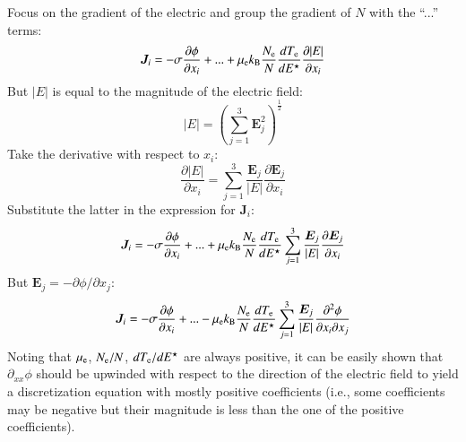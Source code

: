 \documentclass{warpdoc}
\newcommand{\nd}{3}
\renewcommand{\vec}[1]{\bm{#1}}
\begin{document}
%
Focus on the gradient of the electric and group the gradient of $N$ with the ``...'' terms:
%
\begin{equation}
 \vec{J}_i = 
- \sigma\frac{\partial \phi}{\partial x_i}
+ ...
+ \mu_{\rm e} k_{\rm B} \frac{N_{\rm e}}{N} \frac{d T_{\rm e}}{d E^\star}\frac{\partial |E|}{\partial x_i}
\end{equation}
%
But $|E|$ is equal to the magnitude of the electric field:
%
\begin{equation}
  |E|= \left(\sum_{j=1}^\nd \vec{E}_j^2 \right)^\frac{1}{2}
\end{equation}
%
Take the derivative with respect to $x_i$:
%
\begin{equation}
  \frac{\partial |E|}{\partial x_i} = \sum_{j=1}^\nd \frac{\vec{E}_j}{|E|} \frac{\partial \vec{E}_j}{\partial x_i} 
\end{equation}
%
Substitute the latter in the expression for $\vec{J}_i$:
%
\begin{equation}
 \vec{J}_i = 
- \sigma\frac{\partial \phi}{\partial x_i}
+ ...
+ \mu_{\rm e} k_{\rm B} \frac{N_{\rm e}}{N} \frac{d T_{\rm e}}{d E^\star}\sum_{j=1}^\nd \frac{\vec{E}_j}{|E|} \frac{\partial \vec{E}_j}{\partial x_i}
\end{equation}
%
But $\vec{E}_j=-\partial \phi/\partial x_j$:
%
\begin{equation}
 \vec{J}_i = 
- \sigma\frac{\partial \phi}{\partial x_i}
+ ...
- \mu_{\rm e} k_{\rm B} \frac{N_{\rm e}}{N} \frac{d T_{\rm e}}{d E^\star}\sum_{j=1}^\nd \frac{\vec{E}_j}{|E|}  \frac{\partial^2 \phi}{\partial x_i \partial x_j}
\end{equation}
%
Noting that $\mu_{\rm e}$, ${N_{\rm e}}/{N}$, ${d T_{\rm e}}/{d E^\star}$ are always positive, it can be easily shown that $\partial_{xx}\phi$ should be upwinded with respect to the direction of the electric field to yield a discretization equation with mostly positive coefficients (i.e., some coefficients may be negative but their magnitude is less than the one of the positive coefficients).   
\end{document}

